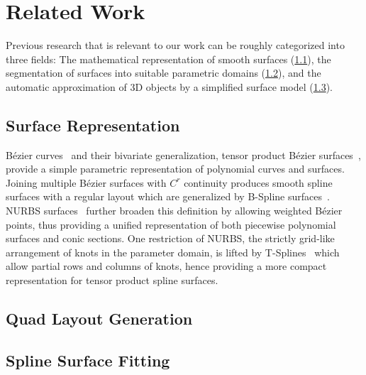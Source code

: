 \chapter{Related Work}\label{sec:related-work}
Previous research that is relevant to our work can be roughly categorized into
three fields: The mathematical representation of smooth surfaces
(\cref{sec:surface-representation}), the segmentation of surfaces into suitable
parametric domains (\cref{sec:quad-layout-generation}), and the automatic
approximation of 3D objects by a simplified surface model
(\cref{sec:spline-surface-fitting}).

\section{Surface Representation}\label{sec:surface-representation}
B{\'e}zier curves~\cite{Cas63,Bez67} and their bivariate
generalization, tensor product B{\'e}zier surfaces~\cite{Boo62}, provide a simple
parametric representation of polynomial curves and surfaces. Joining multiple
B{\'e}zier surfaces with $C^r$ continuity produces smooth spline surfaces with a regular layout which are generalized by
B-Spline surfaces~\cite{GR74}. NURBS surfaces~\cite{Ver75} further broaden this definition by allowing
weighted B{\'e}zier points, thus providing a unified representation of both
piecewise polynomial surfaces and conic sections.  One
restriction of NURBS, the strictly grid-like arrangement of knots in the
parameter domain, is lifted by T-Splines~\cite{SZB+03} which
allow partial rows and columns of knots, hence providing a more compact
representation for tensor product spline surfaces.

\rlipsum[3]

\section{Quad Layout Generation}\label{sec:quad-layout-generation}
\rlipsum[3]

\section{Spline Surface Fitting}\label{sec:spline-surface-fitting}
\rlipsum[3]
